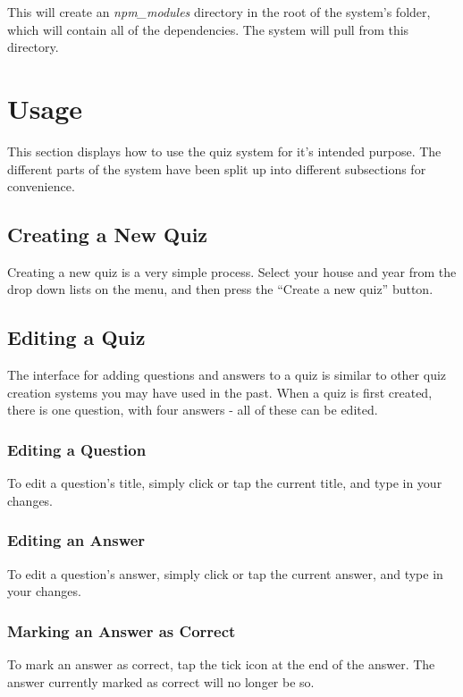 This will create an \textit{npm\_modules} directory in the root of the system's folder, which will contain all of the dependencies. The system will pull from this directory.


\section{Usage} %
\label{sec:usage}
This section displays how to use the quiz system for it's intended purpose. The different parts of the system have been split up into different subsections for convenience.

\subsection{Creating a New Quiz} %
\label{sub:creating_a_quiz}
Creating a new quiz is a very simple process. Select your house and year from the drop down lists on the menu, and then press the ``Create a new quiz'' button.

\subsection{Editing a Quiz} %
\label{sub:editing_a_quiz}
The interface for adding questions and answers to a quiz is similar to other quiz creation systems you may have used in the past. When a quiz is first created, there is one question, with four answers - all of these can be edited.

\subsubsection{Editing a Question} %
\label{ssub:editing_a_question}
To edit a question's title, simply click or tap the current title, and type in your changes.

\subsubsection{Editing an Answer} %
\label{ssub:editing_an_answer}
To edit a question's answer, simply click or tap the current answer, and type in your changes.

\subsubsection{Marking an Answer as Correct} %
\label{ssub:marking_an_answer_as_correct}
To mark an answer as correct, tap the tick icon at the end of the answer. The answer currently marked as correct will no longer be so.

